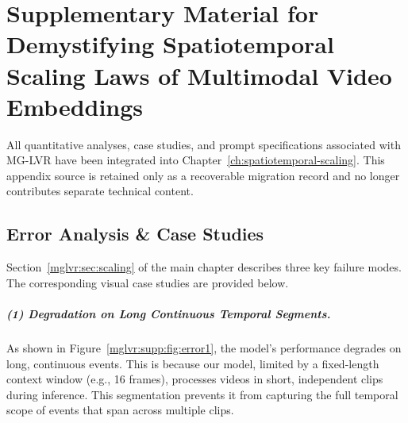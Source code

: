\chapter{Supplementary Material for Demystifying Spatiotemporal Scaling Laws of Multimodal Video Embeddings}
\label{app:mglvr}


All quantitative analyses, case studies, and prompt specifications associated with MG-LVR have been integrated into Chapter~\ref{ch:spatiotemporal-scaling}. This appendix source is retained only as a recoverable migration record and no longer contributes separate technical content.

\iffalse %
\section{Error Analysis \& Case Studies}
\label{mglvr:supp:sec:error}

Section~\ref{mglvr:sec:scaling} of the main chapter describes three key failure modes. The corresponding visual case studies are provided below.

\paragraph{(1) Degradation on Long Continuous Temporal Segments.}
As shown in Figure~\ref{mglvr:supp:fig:error1}, the model's performance degrades on long, continuous events. This is because our model, limited by a fixed-length context window (e.g., 16 frames), processes videos in short, independent clips during inference. This segmentation prevents it from capturing the full temporal scope of events that span across multiple clips.

